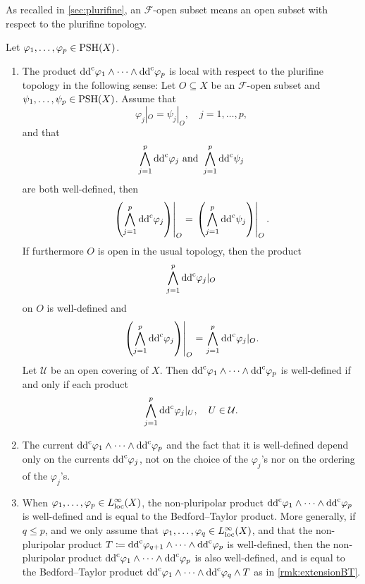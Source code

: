 As recalled in \cref{sec:plurifine}, an $\mathcal{F}$-open subset means an open subset with respect to the plurifine topology.
\begin{proposition} \label{prop:npp1}
Let $\varphi_1,\ldots,\varphi_p\in \mathrm{PSH}(X)$.
\begin{enumerate}
\item\label{itm:prop:npp1:1} The product $\mathrm{dd}^{\mathrm{c}} \varphi_1\wedge\cdots\wedge \mathrm{dd}^{\mathrm{c}} \varphi_p$ is local with respect to the plurifine topology in the following sense: Let $O\subseteq X$ be an $\mathcal{F}$-open subset and $\psi_1,\ldots,\psi_p\in \mathrm{PSH}(X)$. Assume that
\[
\varphi_j|_{O}=\psi_j|_{O},\quad j=1,\ldots,p,
\]
and that
\[
\bigwedge_{j=1}^p \mathrm{dd}^{\mathrm{c}} \varphi_j\textup{ and } \bigwedge_{j=1}^p \mathrm{dd}^{\mathrm{c}} \psi_j
\]
are both well-defined, then
    \begin{equation}\label{eq:ppp1}
    \left.\left(\bigwedge_{j=1}^p \mathrm{dd}^{\mathrm{c}} \varphi_j\right)\right|_{O}=\left.\left(\bigwedge_{j=1}^p \mathrm{dd}^{\mathrm{c}} \psi_j\right)\right|_{O}.
    \end{equation}
If furthermore $O$ is open in the usual topology, then the product
\[
\bigwedge_{j=1}^p \mathrm{dd}^{\mathrm{c}} \varphi_j|_{O}
\]
on $O$ is well-defined and
\begin{equation}\label{eq:ppp2}
\left. \left(\bigwedge_{j=1}^p \mathrm{dd}^{\mathrm{c}} \varphi_j\right)\right|_{O}=\bigwedge_{j=1}^p \mathrm{dd}^{\mathrm{c}} \varphi_j|_{O}.
\end{equation}
Let $\mathcal{U}$ be an open covering of $X$. Then $\mathrm{dd}^{\mathrm{c}} \varphi_1\wedge\cdots\wedge \mathrm{dd}^{\mathrm{c}} \varphi_p$
is well-defined if and only if each product
\[
\bigwedge_{j=1}^p \mathrm{dd}^{\mathrm{c}} \varphi_j|_{U},\quad U\in \mathcal{U}.
\]
    \item\label{itm:prop:npp1:2} The current $\mathrm{dd}^{\mathrm{c}} \varphi_1\wedge\cdots\wedge \mathrm{dd}^{\mathrm{c}} \varphi_p$ and the fact that it is well-defined depend only on the currents $\mathrm{dd}^{\mathrm{c}} \varphi_j$, not on the choice of the $\varphi_j$'s nor on the ordering of the $\varphi_j$'s.
    \item\label{itm:prop:npp1:3} When $\varphi_1,\ldots,\varphi_p\in L^{\infty}_{\mathrm{loc}}(X)$, the non-pluripolar product $\mathrm{dd}^{\mathrm{c}} \varphi_1\wedge\cdots\wedge \mathrm{dd}^{\mathrm{c}} \varphi_p$ is well-defined and is equal to the Bedford--Taylor product. More generally, if $q\leq p$, and we only assume that $\varphi_1,\ldots,\varphi_q\in L^{\infty}_{\mathrm{loc}}(X)$, and that the non-pluripolar product $T\coloneqq \mathrm{dd}^{\mathrm{c}} \varphi_{q+1}\wedge \cdots \wedge \mathrm{dd}^{\mathrm{c}} \varphi_p$ is well-defined, then the non-pluripolar product $\mathrm{dd}^{\mathrm{c}} \varphi_1\wedge\cdots\wedge \mathrm{dd}^{\mathrm{c}} \varphi_p$ is also well-defined, and is equal to the Bedford--Taylor product $\mathrm{dd}^{\mathrm{c}} \varphi_1\wedge\cdots\wedge \mathrm{dd}^{\mathrm{c}} \varphi_q\wedge T$ as in \cref{rmk:extensionBT}.

\end{enumerate}
\end{proposition}
